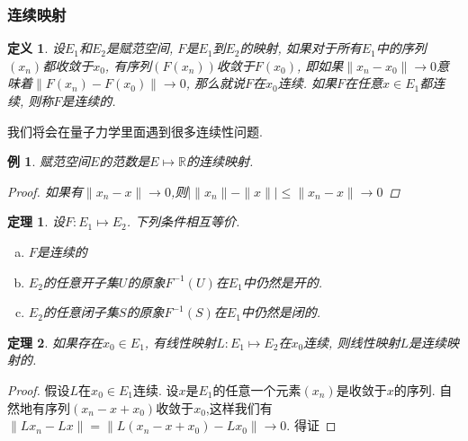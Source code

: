 \documentclass[a4paper,11pt]{article}
\newtheorem{definition}{\hspace{2em}定义}[section]
\newtheorem{theorem}{\hspace{2em}定理}[section]
\newtheorem{proof}{证明}[section]
\newtheorem{example}{例}[section]
\begin{document}
\subsubsection*{连续映射}
\begin{definition}
  设$E_1$和$E_2$是赋范空间, $F$是$E_1$到$E_2$的映射, 如果对于所有$E_1$中的序列$(x_n)$都收敛于$x_0$, 有序列$(F(x_n))$收敛于$F(x_0)$, 即如果$\|x_n-x_0\|\to0$意味着$\|F(x_n)-F(x_0)\|\to0$, 那么就说$F$在$x_0$连续. 如果$F$在任意$x\in E_1$都连续, 则称$F$是连续的.
\end{definition}
我们将会在量子力学里面遇到很多连续性问题.
\begin{example}
  赋范空间$E$的范数是$E\mapsto\mathbb{R}$的连续映射.
  \begin{proof}
    如果有$\|x_n-x\|\to0$,则$|\|x_n\|-\|x\||\leq\|x_n-x\|\to 0$
  \end{proof}
\end{example}
\begin{theorem}
  设$F:E_1\mapsto E_2$. 下列条件相互等价.
  \begin{enumerate}[(a)]
    \item $F$是连续的
    \item $E_2$的任意开子集$U$的原象$F^{-1}(U)$在$E_1$中仍然是开的.
    \item $E_2$的任意闭子集$S$的原象$F^{-1}(S)$在$E_1$中仍然是闭的.
  \end{enumerate}
\end{theorem}
\begin{theorem}\label{continuous linear map}
  如果存在$x_0\in E_1$, 有线性映射$L:E_1\mapsto E_2$在$x_0$连续, 则线性映射$L$是连续映射的.
\end{theorem}
\begin{proof}
  假设$L$在$x_0\in E_1$连续. 设$x$是$E_1$的任意一个元素$(x_n)$是收敛于$x$的序列. 自然地有序列$(x_n-x+x_0)$收敛于$x_0$,这样我们有$\|Lx_n-Lx\|=\|L(x_n-x+x_0)-Lx_0\|\to 0$. 得证
\end{proof}
\end{document}
